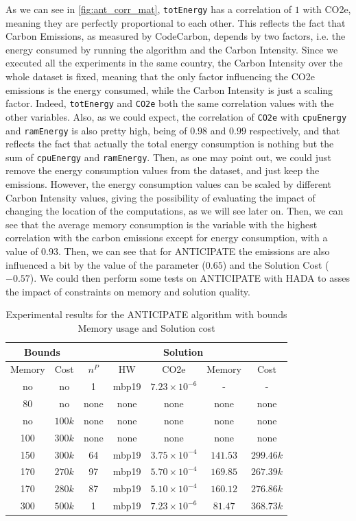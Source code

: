\documentclass[a4paper,singleside,12pt]{report} %
\begin{document}
As we can see in \ref{fig:ant_corr_mat}, \verb|totEnergy| has a correlation of $1$ with CO2e, meaning they are perfectly proportional to each other. This reflects the fact that Carbon Emissions,
as measured by CodeCarbon, depends by two factors, i.e. the energy consumed by running the algorithm and the Carbon Intensity. Since we executed all the experiments in the same
country, the Carbon Intensity over the whole dataset is fixed, meaning that the only factor influencing the CO2e emissions is the energy consumed, while the Carbon Intensity
is just a scaling factor. Indeed, \verb|totEnergy| and \verb|CO2e| both the same correlation values with the other variables. Also, as we could expect, the correlation
of \verb|CO2e| with \verb|cpuEnergy| and \verb|ramEnergy| is also pretty high, being of $0.98$ and $0.99$ respectively, and that reflects the fact that actually the total energy consumption is
nothing but the sum of \verb|cpuEnergy| and \verb|ramEnergy|. Then, as one may point out, we could just remove the energy consumption values from the dataset, and just keep the emissions.
However, the energy consumption values can be scaled by different Carbon Intensity values, giving the possibility of evaluating the impact of changing the location of the computations, as we will see later on.
Then, we can see that the average memory consumption is the variable with the highest correlation with the carbon emissions except for energy consumption, with a value of $0.93$. Then, we can see
that for ANTICIPATE the emissions are also influenced a bit by the value of the parameter ($0.65$) and the Solution Cost ($-0.57$). We could then perform some tests on ANTICIPATE with HADA
to asses the impact of constraints on memory and solution quality.

\begin{table}[h!]
    \centering
    \begin{tabular}{|cc|ccccc|}
        \hline
        \multicolumn{2}{|c|}{Bounds} & \multicolumn{5}{c|}{Solution} \\
        \hline
        Memory & Cost & $n^P$ & HW & CO2e & Memory & Cost \\
        \hline
        no & no & 1 & mbp19 & $7.23 \times 10^{-6}$ & - & - \\
        80 & no & none & none & none & none & none \\
        no & $100k$ & none & none & none & none & none \\
        100 & $300k$ & none & none & none & none & none \\
        150 & $300k$ & 64 & mbp19 & $3.75 \times 10^{-4}$ & $141.53$ & $299.46k$ \\
        170 & $270k$ & 97 & mbp19 & $5.70 \times 10^{-4}$ & $169.85$ & $267.39k$ \\
        170 & $280k$ & 87 & mbp19 & $5.10 \times 10^{-4}$ & $160.12$ & $276.86k$ \\
        300 & $500k$ & 1 & mbp19 & $7.23 \times 10^{-6}$ & $81.47$ & $368.73k$ \\
        \hline
    \end{tabular}
    \caption{Experimental results for the ANTICIPATE algorithm with bounds Memory usage and Solution cost}
    \label{tab:anticipate_results}
\end{table}
\end{document}
